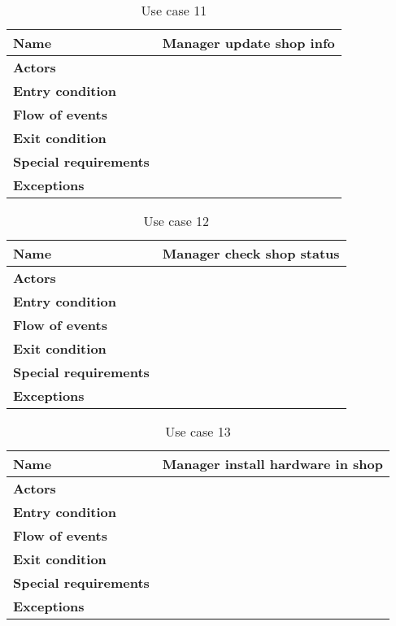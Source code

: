 \begin{table}[h!]
    \centering
    \begin{tabular}{@{}P{0.2\textwidth}P{0.70\textwidth}@{}}
        \toprule
        \textbf{Name}                 & Manager update shop info\\
        \midrule
        \textbf{Actors}               & \\
        \textbf{Entry condition}      & \\
        \textbf{Flow of events}       & \\
        \textbf{Exit condition}       & \\
        \textbf{Special requirements} & \\
        \textbf{Exceptions}           & \\
        \bottomrule
    \end{tabular}
\caption{Use case 11}
\label{table:usecase11}
\end{table}

\begin{table}[h!]
    \centering
    \begin{tabular}{@{}P{0.2\textwidth}P{0.70\textwidth}@{}}
        \toprule
        \textbf{Name}                 & Manager check shop status\\
        \midrule
        \textbf{Actors}               & \\
        \textbf{Entry condition}      & \\
        \textbf{Flow of events}       & \\
        \textbf{Exit condition}       & \\
        \textbf{Special requirements} & \\
        \textbf{Exceptions}           & \\
        \bottomrule
    \end{tabular}
\caption{Use case 12}
\label{table:usecase12}
\end{table}

\begin{table}[h!]
    \centering
    \begin{tabular}{@{}P{0.2\textwidth}P{0.70\textwidth}@{}}
        \toprule
        \textbf{Name}                 & Manager install hardware in shop\\
        \midrule
        \textbf{Actors}               & \\
        \textbf{Entry condition}      & \\
        \textbf{Flow of events}       & \\
        \textbf{Exit condition}       & \\
        \textbf{Special requirements} & \\
        \textbf{Exceptions}           & \\
        \bottomrule
    \end{tabular}
\caption{Use case 13}
\label{table:usecase13}
\end{table}


